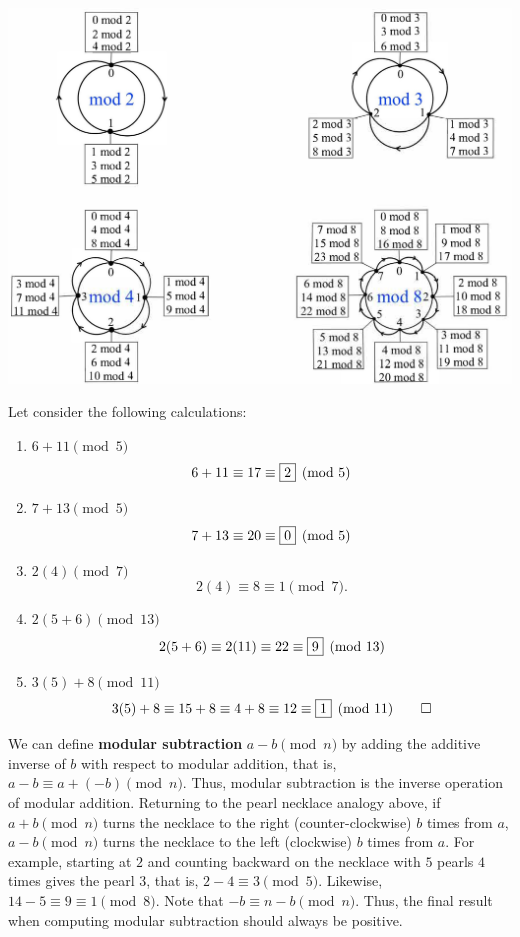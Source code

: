\centerline{\includegraphics[scale=1]{Chapter1/images/necklace.png}} %

\begin{Exam}\label{exam:1.2modcalc} Let consider the following calculations: 
\begin{enumerate}
\item $6+11 \pmod 5$\\
\[6+11\equiv 17\equiv \fbox{$2$} \pmod 5\]
\item $7+13 \pmod 5$\\
\[7+13 \equiv 20\equiv \fbox{$0$} \pmod 5\]
\item\label{item:1.2inverse} $2(4) \pmod{7}$\\
\[2(4) \equiv 8\equiv 1 \pmod 7.\]
\item $2(5+6) \pmod{13}$\\
\[ 2(5+6) \equiv 2(11) \equiv 22 \equiv \fbox{$9$} \pmod{13}\]
\item $3(5)+8 \pmod{11}$\\
\[3(5)+8 \equiv 15+8 \equiv 4+8 \equiv 12 \equiv \fbox{$1$} \pmod{11}\qedhere\]
\end{enumerate}
\end{Exam}\vs

We can define \textbf{modular subtraction} $a-b \pmod n$ by adding the additive inverse of $b$ with respect to modular addition, that is, $a-b \equiv a+(-b)\pmod n$. Thus, modular subtraction is the inverse operation of modular addition. Returning to the pearl necklace analogy above, if $a+b\pmod n$ turns the necklace to the right (counter-clockwise) $b$ times from $a$, $a-b\pmod n$ turns the necklace to the left (clockwise) $b$ times from $a$. For example, starting at $2$ and counting backward on the necklace with $5$ pearls $4$ times gives the pearl $3$, that is, $2-4\equiv 3\pmod 5$. Likewise, $14-5 \equiv 9 \equiv 1\pmod 8$. %
Note that $-b \equiv n-b \pmod n$. Thus, the final result when computing modular subtraction should always be positive.\\ %

